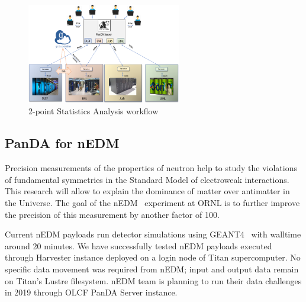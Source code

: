 \documentclass{webofc}
\begin{document}
\begin{figure}
	\centering
	\includegraphics[width=0.60\textwidth]{figures/LQCD_future_environment.png}
	\caption{2-point Statistics Analysis workflow}
	\label{fig:lqcd_env}
\end{figure}


\subsection{PanDA for nEDM} \label{section_nedm}

Precision measurements of the properties of neutron help to study the violations of fundamental symmetries in the Standard Model of electroweak interactions. 
This research will allow to explain the dominance of matter over antimatter in the Universe. 
The goal of the nEDM~\cite{Lamoreaux_2009} experiment at ORNL is to further improve the precision of this measurement by another factor of 100.

Current nEDM payloads run detector simulations using GEANT4~\cite{AGOSTINELLI2003250} with walltime around 20 minutes. We have successfully tested nEDM payloads executed through Harvester instance deployed on a login node of Titan supercomputer. No specific data movement was required from nEDM; input and output data remain on Titan’s Lustre filesystem. nEDM team is planning to run their data challenges in 2019 through OLCF PanDA Server instance.


\end{document}
